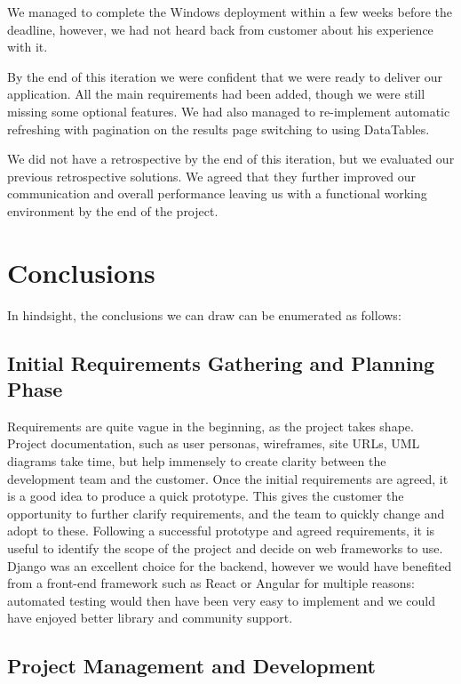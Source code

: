 \documentclass{l3proj}
\begin{document}
We managed to complete the Windows deployment within a few weeks before the deadline, however, we had not heard back from customer about his experience with it. 

By the end of this iteration we were confident that we were ready to deliver our application. All the main requirements had been added, though we were still missing some optional features. We had also managed to re-implement automatic refreshing with pagination on the results page switching to using DataTables.

We did not have a retrospective by the end of this iteration, but we evaluated our previous retrospective solutions. We agreed that they further improved our communication and overall performance leaving us with a functional working environment by the end of the project.

\section{Conclusions}

In hindsight, the conclusions we can draw can be enumerated as follows:

\subsection{Initial Requirements Gathering and Planning Phase}

Requirements are quite vague in the beginning, as the project takes shape. Project documentation, such as user personas, wireframes, site URLs, UML diagrams take time, but help immensely to create clarity between the development team and the customer.
Once the initial requirements are agreed, it is a good idea to produce a quick prototype. This gives the customer the opportunity to further clarify requirements, and the team to quickly change and adopt to these. Following a successful prototype and agreed requirements, it is useful to identify the scope of the project and decide on web frameworks to use. Django was an excellent choice for the backend, however we would have benefited from a front-end framework such as React or Angular for multiple reasons: automated testing would then have been very easy to implement and we could have enjoyed better library and community support.


\subsection{Project Management and Development}
\end{document}
